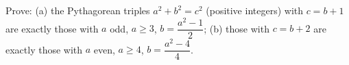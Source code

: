 Prove: (a) the Pythagorean triples $a^2+b^2=c^2$ (positive integers) with $c=b+1$ are exactly those with $a$ odd, $a\ge3$, $b=\dfrac{a^2-1}2$; (b) those with $c=b+2$ are exactly those with $a$ even, $a\ge4$, $b=\dfrac{a^2-4}4$.

